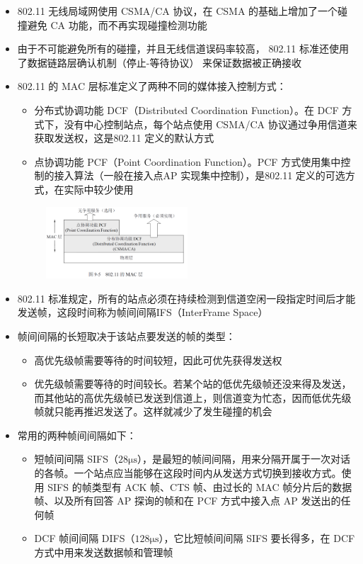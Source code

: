 \documentclass[cs4size,a4paper,10pt]{ctexart}
\begin{document}
	\begin{itemize}
		\item 802.11 无线局域网使用 CSMA/CA 协议，在 CSMA 的基础上增加了一个碰撞避免 CA 功能，而不再实现碰撞检测功能
		\item 由于不可能避免所有的碰撞，并且无线信道误码率较高， 802.11 标准还使用了数据链路层确认机制（停止-等待协议） 来保证数据被正确接收
		\item 802.11 的 MAC 层标准定义了两种不同的媒体接入控制方式：
		\begin{itemize}
			\item 分布式协调功能 DCF（Distributed Coordination Function）。在 DCF 方式下，没有中心控制站点，每个站点使用 CSMA/CA 协议通过争用信道来获取发送权，这是802.11 定义的默认方式
			\item 点协调功能 PCF（Point Coordination Function）。PCF 方式使用集中控制的接入算法（一般在接入点AP 实现集中控制），是802.11 定义的可选方式，在实际中较少使用
		\end{itemize}
		\begin{figure}[H]
			\centering
			\includegraphics[width=0.5\textwidth]{img/3.4.3.2}
		\end{figure}
		\item 802.11 标准规定，所有的站点必须在持续检测到信道空闲一段指定时间后才能发送帧，这段时间称为帧间间隔IFS（InterFrame Space）
		\item 帧间间隔的长短取决于该站点要发送的帧的类型：
		\begin{itemize}
			\item 高优先级帧需要等待的时间较短，因此可优先获得发送权
			\item 优先级帧需要等待的时间较长。若某个站的低优先级帧还没来得及发送，而其他站的高优先级帧已发送到信道上，则信道变为忙态，因而低优先级帧就只能再推迟发送了。这样就减少了发生碰撞的机会
		\end{itemize}
		\item 常用的两种帧间间隔如下：
		\begin{itemize}
			\item 短帧间间隔 SIFS（$28\mathrm{\mu s}$），是最短的帧间间隔，用来分隔开属于一次对话的各帧。一个站点应当能够在这段时间内从发送方式切换到接收方式。使用 SIFS 的帧类型有 ACK 帧、CTS 帧、由过长的 MAC 帧分片后的数据帧、以及所有回答 AP 探询的帧和在 PCF 方式中接入点 AP 发送出的任何帧
			\item DCF 帧间间隔 DIFS（$128\mathrm{\mu s}$），它比短帧间间隔 SIFS 要长得多，在 DCF 方式中用来发送数据帧和管理帧
		\end{itemize}
	\end{itemize}
\end{document}
